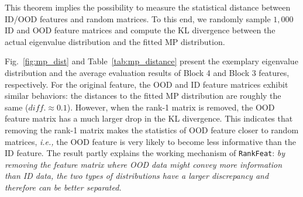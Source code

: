 This theorem implies the possibility to measure the statistical distance between ID/OOD features and random matrices. To this end, we randomly sample $1,000$ ID and OOD feature matrices and compute the KL divergence between the actual eigenvalue distribution and the fitted MP distribution.




\begin{table}[htbp]
    \caption{The KL divergence between ID/OOD feature and the fitted MP distribution. When the rank-1 feature is removed, the statistics of OOD matrix are closer to random matrices. }
    \centering
    \label{tab:mp_distance}
\end{table}

Fig.~\ref{fig:mp_dist} and Table~\ref{tab:mp_distance} present the exemplary eigenvalue distribution and the average evaluation results of Block 4 and Block 3 features, respectively. For the original feature, the OOD and ID feature matrices exhibit similar behaviors: the distances to the fitted MP distribution are roughly the same ($diff.{\approx}0.1$). However, when the rank-1 matrix is removed, the OOD feature matrix has a much larger drop in the KL divergence. This indicates that removing the rank-1 matrix makes the statistics of OOD feature closer to random matrices, \emph{i.e.,} the OOD feature is very likely to become less informative than the ID feature. The result partly explains the working mechanism of \texttt{RankFeat}: \textit{by removing the feature matrix where OOD data might convey more information than ID data, the two types of distributions have a larger discrepancy and therefore can be better separated.} 





